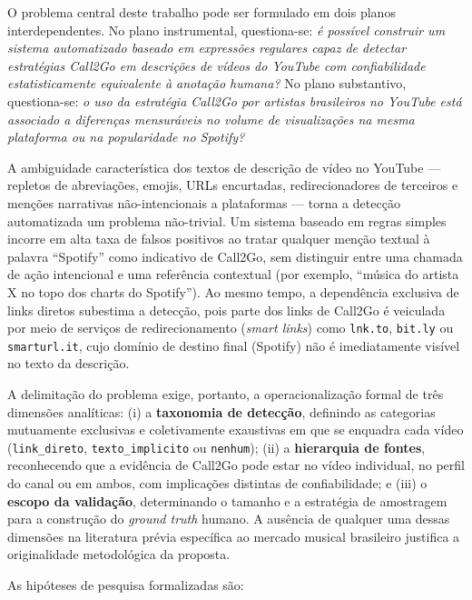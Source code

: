 \documentclass[12pt, a4paper]{article}
\begin{document}
O problema central deste trabalho pode ser formulado em dois planos interdependentes. No plano instrumental, questiona-se: \textit{é possível construir um sistema automatizado baseado em expressões regulares capaz de detectar estratégias Call2Go em descrições de vídeos do YouTube com confiabilidade estatisticamente equivalente à anotação humana?} No plano substantivo, questiona-se: \textit{o uso da estratégia Call2Go por artistas brasileiros no YouTube está associado a diferenças mensuráveis no volume de visualizações na mesma plataforma ou na popularidade no Spotify?}

A ambiguidade característica dos textos de descrição de vídeo no YouTube --- repletos de abreviações, emojis, URLs encurtadas, redirecionadores de terceiros e menções narrativas não-intencionais a plataformas --- torna a detecção automatizada um problema não-trivial. Um sistema baseado em regras simples incorre em alta taxa de falsos positivos ao tratar qualquer menção textual à palavra ``Spotify'' como indicativo de Call2Go, sem distinguir entre uma chamada de ação intencional e uma referência contextual (por exemplo, ``música do artista X no topo dos charts do Spotify''). Ao mesmo tempo, a dependência exclusiva de links diretos subestima a detecção, pois parte dos links de Call2Go é veiculada por meio de serviços de redirecionamento (\textit{smart links}) como \texttt{lnk.to}, \texttt{bit.ly} ou \texttt{smarturl.it}, cujo domínio de destino final (Spotify) não é imediatamente visível no texto da descrição.

A delimitação do problema exige, portanto, a operacionalização formal de três dimensões analíticas: (i) a \textbf{taxonomia de detecção}, definindo as categorias mutuamente exclusivas e coletivamente exaustivas em que se enquadra cada vídeo (\texttt{link\_direto}, \texttt{texto\_implicito} ou \texttt{nenhum}); (ii) a \textbf{hierarquia de fontes}, reconhecendo que a evidência de Call2Go pode estar no vídeo individual, no perfil do canal ou em ambos, com implicações distintas de confiabilidade; e (iii) o \textbf{escopo da validação}, determinando o tamanho e a estratégia de amostragem para a construção do \textit{ground truth} humano. A ausência de qualquer uma dessas dimensões na literatura prévia específica ao mercado musical brasileiro justifica a originalidade metodológica da proposta.

As hipóteses de pesquisa formalizadas são:
\end{document}
